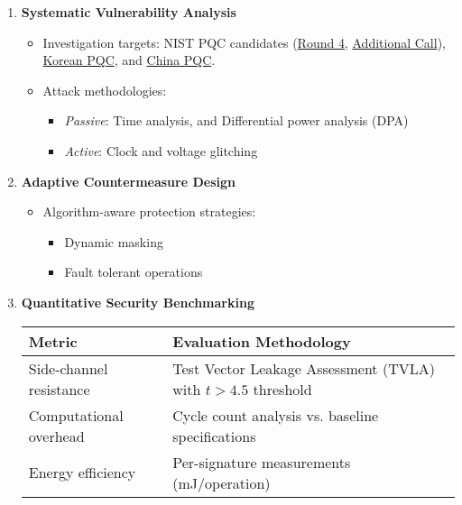 \documentclass[11pt, a4paper]{article}
\begin{document}
\begin{enumerate}[leftmargin=*, label=\textbf{\arabic*.}, series=main]
    \item \textbf{Systematic Vulnerability Analysis}
    \begin{itemize}[leftmargin=2em]
        \item Investigation targets: NIST PQC candidates (\href{https://csrc.nist.gov/projects/post-quantum-cryptography/round-4-submissions}{Round 4}, \href{https://csrc.nist.gov/projects/pqc-dig-sig/round-2-additional-signatures}{Additional Call}), 
        \href{https://www.kpqc.or.kr/competition.html}{Korean PQC}, and \href{https://niccs.org.cn/en/notice/}{China PQC}.
        \item Attack methodologies:
        \begin{itemize}
            \item \textit{Passive}: Time analysis, and Differential power analysis (DPA)
            \item \textit{Active}: Clock and voltage glitching
        \end{itemize}
    \end{itemize}
    
    \item \textbf{Adaptive Countermeasure Design}
    \begin{itemize}[leftmargin=2em]
        \item Algorithm-aware protection strategies:
        \begin{itemize}
            \item Dynamic masking
            \item Fault tolerant operations
        \end{itemize}
    \end{itemize}
    
    \item \textbf{Quantitative Security Benchmarking}
    \begin{center}
    \begin{tabularx}{\textwidth}{|l|X|}
        \toprule
        \rowcolor{gray!40} %
        \textbf{Metric} & \textbf{Evaluation Methodology} \\
        \midrule
        Side-channel resistance & Test Vector Leakage Assessment (TVLA) with $t > 4.5$ threshold \\
         \midrule
        Computational overhead & Cycle count analysis vs. baseline specifications \\
         \midrule
        Energy efficiency & Per-signature measurements (mJ/operation) \\
        \bottomrule
    \end{tabularx}
    \end{center}
\end{enumerate}
\end{document}
